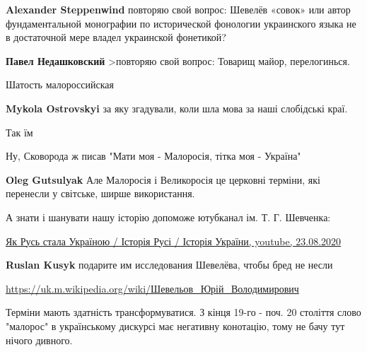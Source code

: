 \begin{itemize}
\begin{itemize}
\textbf{Alexander Steppenwind} повторяю свой вопрос: Шевелёв «совок» или автор фундаментальной монографии по исторической фонологии украинского языка не в достаточной мере владел украинской фонетикой?

\textbf{Павел Недашковский} >повторяю свой вопрос:
Товарищ майор, перелогинься.

\end{itemize} %

Шатость малороссийская

\begin{itemize} %
\textbf{Mykola Ostrovskyi} за яку згадували, коли шла мова за наші слобідські краї.
\end{itemize} %

Так їм

Ну, Сковорода ж писав "Мати моя - Малоросія, тітка моя - Україна"

\begin{itemize} %
\textbf{Oleg Gutsulyak} Але Малоросія і Великоросія це церковні терміни, які перенесли у світське, ширше використання.
\end{itemize} %


А знати і шанувати нашу історію допоможе ютубканал ім. Т. Г. Шевченка:

\href{https://youtu.be/5Zna0WTzFtY}{%
Як Русь стала Україною / Історія Русі / Історія України, youtube, 23.08.2020%
}

\begin{itemize} %
\textbf{Ruslan Kusyk} подарите им исследования Шевелёва, чтобы бред не несли

\url{https://uk.m.wikipedia.org/wiki/Шевельов_Юрій_Володимирович}

\end{itemize} %


Терміни мають здатність трансформуватися. З кінця 19-го - поч. 20 століття
слово "малорос" в українському дискурсі має негативну конотацію, тому не бачу
тут нічого дивного.

\begin{itemize} %

\end{itemize} %

\end{itemize} %

